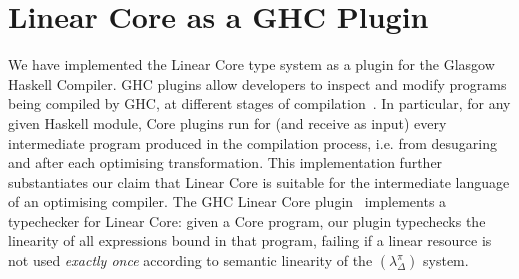 \documentclass[acmsmall,review,anonymous,screen]{acmart}
\newcommand{\notyetcolorname}{light yellow}
\begin{document}


\section{Linear Core as a GHC Plugin\label{sec:discuss:implementation}}

We have implemented the Linear Core type system as a plugin for the Glasgow
Haskell Compiler.
GHC plugins allow developers to inspect and modify programs being compiled by
GHC, at different stages of compilation~\cite{10.1145/3331545.3342599}.
%
In particular, for any given Haskell module, Core plugins run for (and receive
as input) every intermediate program produced in the compilation process, i.e.
from desugaring and after each optimising transformation.
%
This implementation further substantiates our claim that Linear Core is
suitable for the intermediate language of an optimising compiler.
The GHC Linear Core plugin~\cite{cite:linear-core-plugin} implements a
typechecker for Linear Core: given a Core program, our plugin typechecks the
linearity of all expressions bound in that program, failing if a linear
resource is not used \emph{exactly once} according to semantic linearity of the
$(\lambda^\pi_\Delta)$ system.
%


\end{document}

